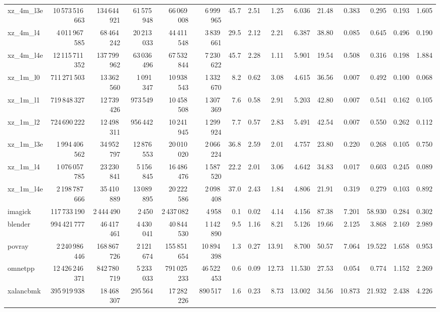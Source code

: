 \documentclass[9pt,landscape,a4paper]{article}
\begin{document}
\begin{adjustbox}{max width=\textwidth, max totalheight=0.50\textheight}
\begin{tabular}{lrrrrrrrrrrrrrr}
xz\_4m\_l3e & 10\,573\,516\,663 & 134\,644\,921 & 61\,575\,948 & 66\,069\,008 & 6\,999\,965 & 45.7 & 2.51 & 1.25 & 6.036 & 21.48 & 0.383 & 0.295 & 0.193 & 1.605 \\
xz\_4m\_l4 & 4\,011\,967\,585 & 68\,464\,242 & 20\,213\,033 & 44\,411\,548 & 3\,839\,661 & 29.5 & 2.12 & 2.21 & 6.387 & 38.80 & 0.085 & 0.645 & 0.496 & 0.190 \\
xz\_4m\_l4e & 12\,115\,711\,352 & 137\,799\,962 & 63\,036\,496 & 67\,532\,844 & 7\,230\,622 & 45.7 & 2.28 & 1.11 & 5.901 & 19.54 & 0.508 & 0.316 & 0.198 & 1.884 \\
xz\_1m\_l0 & 711\,271\,503 & 13\,362\,560 & 1\,091\,347 & 10\,938\,543 & 1\,332\,670 & 8.2 & 0.62 & 3.08 & 4.615 & 36.56 & 0.007 & 0.492 & 0.100 & 0.068 \\
xz\_1m\_l1 & 719\,848\,327 & 12\,739\,426 & 973\,549 & 10\,458\,508 & 1\,307\,369 & 7.6 & 0.58 & 2.91 & 5.203 & 42.80 & 0.007 & 0.541 & 0.162 & 0.105 \\
xz\_1m\_l2 & 724\,690\,222 & 12\,498\,311 & 956\,442 & 10\,241\,945 & 1\,299\,924 & 7.7 & 0.57 & 2.83 & 5.491 & 42.54 & 0.007 & 0.550 & 0.262 & 0.112 \\
xz\_1m\_l3e & 1\,994\,406\,562 & 34\,952\,797 & 12\,876\,553 & 20\,010\,020 & 2\,066\,224 & 36.8 & 2.59 & 2.01 & 4.757 & 23.80 & 0.220 & 0.268 & 0.105 & 0.750 \\
xz\_1m\_l4 & 1\,076\,057\,785 & 23\,230\,841 & 5\,156\,845 & 16\,486\,476 & 1\,587\,520 & 22.2 & 2.01 & 3.06 & 4.642 & 34.83 & 0.017 & 0.603 & 0.245 & 0.089 \\
xz\_1m\_l4e & 2\,198\,787\,666 & 35\,410\,889 & 13\,089\,895 & 20\,222\,586 & 2\,098\,408 & 37.0 & 2.43 & 1.84 & 4.806 & 21.91 & 0.319 & 0.279 & 0.103 & 0.892 \\
imagick & 117\,733\,190 & 2\,444\,490 & 2\,450 & 2\,437\,082 & 4\,958 & 0.1 & 0.02 & 4.14 & 4.156 & 87.38 & 7.201 & 58.930 & 0.284 & 0.302 \\
blender & 994\,421\,777 & 46\,417\,461 & 4\,430\,041 & 40\,844\,530 & 1\,142\,890 & 9.5 & 1.16 & 8.21 & 5.126 & 19.66 & 2.125 & 3.868 & 2.169 & 2.989 \\
povray & 2\,240\,986\,446 & 168\,867\,726 & 2\,121\,674 & 155\,851\,654 & 10\,894\,398 & 1.3 & 0.27 & 13.91 & 8.700 & 50.57 & 7.064 & 19.522 & 1.658 & 0.953 \\
omnetpp & 12\,426\,246\,371 & 842\,780\,719 & 5\,233\,033 & 791\,025\,233 & 46\,522\,453 & 0.6 & 0.09 & 12.73 & 11.530 & 27.53 & 0.054 & 0.774 & 1.152 & 2.269 \\
xalancbmk & 395\,919\,938 & 18\,468\,307 & 295\,564 & 17\,282\,226 & 890\,517 & 1.6 & 0.23 & 8.73 & 13.002 & 34.56 & 10.873 & 21.932 & 2.438 & 4.226 \\

\end{tabular}
\end{adjustbox}
\end{document}
